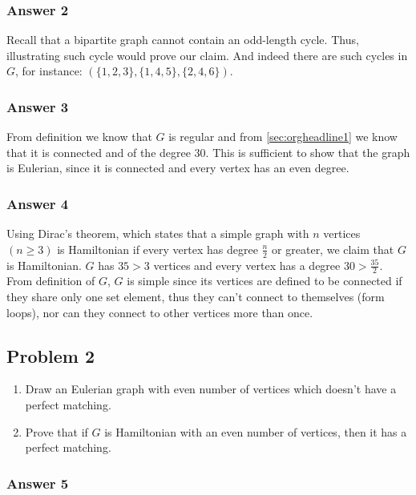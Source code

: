 \documentclass[11pt]{article}
\begin{document}
\subsubsection{Answer 2}
\label{sec:orgheadline2}
Recall that a bipartite graph cannot contain an odd-length cycle.  Thus,
illustrating such cycle would prove our claim.  And indeed there are such
cycles in \(G\), for instance: \((\{1, 2, 3\}, \{1, 4, 5\}, \{2, 4, 6\})\).

\subsubsection{Answer 3}
\label{sec:orgheadline3}
From definition we know that \(G\) is regular and from \ref{sec:orgheadline1} we know that
it is connected and of the degree 30.  This is sufficient to show that the
graph is Eulerian, since it is connected and every vertex has an even
degree.

\subsubsection{Answer 4}
\label{sec:orgheadline4}
Using Dirac's theorem, which states that a simple graph with \(n\) vertices
\((n \geq 3)\) is Hamiltonian if every vertex has degree \(\frac{n}{2}\) or
greater, we claim that \(G\) is Hamiltonian.  \(G\) has \(35 > 3\) vertices and
every vertex has a degree \(30 > \frac{35}{2}\).  From definition of \(G\), \(G\)
is simple since its vertices are defined to be connected if they share only
one set element, thus they can't connect to themselves (form loops), nor can
they connect to other vertices more than once.

\subsection{Problem 2}
\label{sec:orgheadline8}
\begin{enumerate}
\item Draw an Eulerian graph with even number of vertices which doesn't have a
perfect matching.
\item Prove that if \(G\) is Hamiltonian with an even number of vertices, then
it has a perfect matching.
\end{enumerate}

\subsubsection{Answer 5}
\label{sec:orgheadline6}
\end{document}
